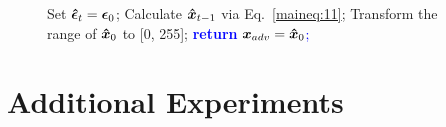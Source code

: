 \documentclass{article}
\begin{document}
\begin{figure}[h]
\begin{minipage}{0.9\linewidth}
\begin{algorithm}[H]
\begin{algorithmic}[1]
            \ELSE
                \STATE Set $\boldsymbol{\Hat{\epsilon}}_{t}=\boldsymbol{\epsilon}_{0}$; 
            \ENDIF
            \STATE Calculate $\boldsymbol{\Hat{x}}_{t-1}$ via Eq.~\eqref{maineq:11}; 
        \ENDFOR
        \STATE Transform the range of $\boldsymbol{\Hat{x}}_{0}$ to [0, 255]; 
        \STATE \textcolor{blue}{\textbf{return} $\boldsymbol{x}_{adv} = \boldsymbol{\Hat{x}}_{0}$;} 
    \end{algorithmic}
\label{alg:2}
\end{algorithm}
\end{minipage}
\end{figure}

\section{Additional Experiments}  \label{app:C}
\end{document}
